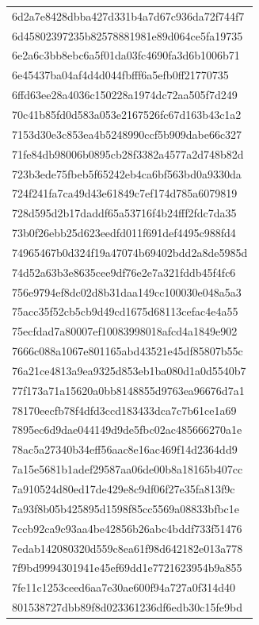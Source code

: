 \begin{tabular}{l}
6d2a7e8428dbba427d331b4a7d67c936da72f744f7 \\
6d45802397235b82578881981e89d064ce5fa19735 \\
6e2a6c3bb8ebc6a5f01da03fc4690fa3d6b1006b71 \\
6e45437ba04af4d4d044fbfff6a5efb0ff21770735 \\
6ffd63ee28a4036c150228a1974dc72aa505f7d249 \\
70c41b85fd0d583a053e2167526fc67d163b43c1a2 \\
7153d30e3c853ea4b5248990ccf5b909dabe66c327 \\
71fe84db98006b0895cb28f3382a4577a2d748b82d \\
723b3ede75fbeb5f65242eb4ca6bf563bd0a9330da \\
724f241fa7ca49d43e61849c7ef174d785a6079819 \\
728d595d2b17daddf65a53716f4b24fff2fdc7da35 \\
73b0f26ebb25d623eedfd011f691def4495c988fd4 \\
74965467b0d324f19a47074b69402bdd2a8de5985d \\
74d52a63b3e8635cee9df76e2e7a321fddb45f4fc6 \\
756e9794ef8dc02d8b31daa149cc100030e048a5a3 \\
75acc35f52cb5cb9d49cd1675d68113cefac4e4a55 \\
75ecfdad7a80007ef10083998018afcd4a1849e902 \\
7666c088a1067e801165abd43521e45df85807b55c \\
76a21ce4813a9ea9325d853eb1ba080d1a0d5540b7 \\
77f173a71a15620a0bb8148855d9763ea96676d7a1 \\
78170eecfb78f4dfd3ccd183433dca7c7b61ce1a69 \\
7895ec6d9dae044149d9de5fbc02ac485666270a1e \\
78ac5a27340b34eff56aac8e16ac469f14d2364dd9 \\
7a15e5681b1adef29587aa06de00b8a18165b407cc \\
7a910524d80ed17de429e8c9df06f27e35fa813f9c \\
7a93f8b05b425895d1598f85cc5569a08833bfbc1e \\
7ccb92ca9c93aa4be42856b26abc4bddf733f51476 \\
7edab142080320d559c8ea61f98d642182e013a778 \\
7f9bd9994301941e45ef69dd1e7721623954b9a855 \\
7fe11c1253ceed6aa7e30ae600f94a727a0f314d40 \\
801538727dbb89f8d023361236df6edb30c15fe9bd \\

\end{tabular}
